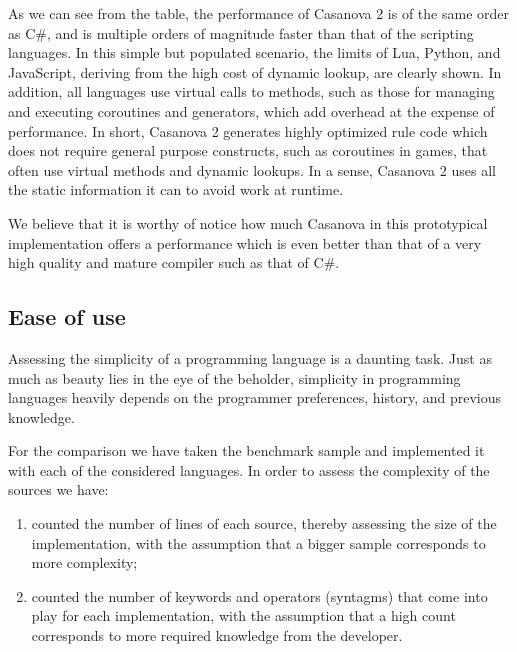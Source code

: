 As we can see from the table, the performance of Casanova 2 is of the same order as C\#, and is multiple orders of magnitude faster than that of the scripting languages.
In this simple but populated scenario, the limits of Lua, Python, and JavaScript, deriving from the high cost of dynamic lookup, are clearly shown. In addition, all languages use virtual calls to methods, such as those for managing and executing coroutines and generators, which add overhead at the expense of performance.
In short, Casanova 2 generates highly optimized rule code which does not require general purpose constructs, such as coroutines in games, that often use virtual methods and dynamic lookups. In a sense, Casanova 2 uses all the static information it can to avoid work at runtime.


We believe that it is worthy of notice how much Casanova in this prototypical implementation offers a performance which is even better than that of a very high quality and mature compiler such as that of C\#.


\subsection{Ease of use}
Assessing the simplicity of a programming language is a daunting task. Just as much as beauty lies in the eye of the beholder, simplicity in programming languages heavily depends on the programmer preferences, history, and previous knowledge. %

For the comparison we have taken the benchmark sample and implemented it with each of the considered languages. In order to assess the complexity of the sources we have:
\begin{enumerate}
\item counted the number of lines of each source, thereby assessing the size of the implementation, with the assumption that a bigger sample corresponds to more complexity;
\item counted the number of keywords and operators (syntagms) that come into play for each implementation, with the assumption that a high count corresponds to more required knowledge from the developer.
\end{enumerate}

